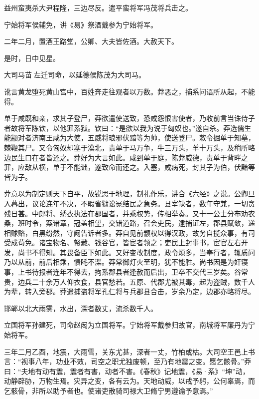 \documentclass[]{article}
\begin{document}
益州蛮夷杀大尹程隆，三边尽反。遣平蛮将军冯茂将兵击之。

宁始将军侯辅免，讲《易》祭酒戴参为宁始将军。

二年二月，置酒王路堂，公卿、大夫皆佐酒。大赦天下。

是时，日中见星。

大司马苗左迁司命，以延德侯陈茂为大司马。

讹言黄龙堕死黄山宫中，百姓奔走往观者以万数。莽恶之，捕系问语所从起，不能得。

单于咸既和亲，求其子登尸，莽欲遣使送致，恐咸怨恨害使者，乃收前言当诛侍子者故将军陈钦，以他罪系狱。钦曰：``是欲以我为说于匈奴也。''遂自杀。莽选儒生能颛对者济南王咸为大使，五威将琅邪伏黯等为帅，使送登尸。敕令掘单于知墓，棘鞭其尸。又令匈奴却塞于漠北，责单于马万争，牛三万头，羊十万头，及稍所略边民生口在者皆还之。莽好为大言如此。咸到单于庭，陈莽威德，责单于背畔之罪，应敌从横，单于不能诎，遂致命而还之。入塞，咸病死，封其子为伯，伏黯等皆为子。

莽意以为制定则天下自平，故锐思于地理，制礼作乐，讲合《六经》之说。公卿旦入暮出，议论连年不决，不暇省狱讼冤结民之急务。县宰缺者，数年守兼，一切贪残日甚。中郎将、绣衣执法在郡国者，并乘权势，传相举奏。又十一公士分布劝农桑，班时令，案诸章，冠盖相望，交错道路，召会吏民，逮捕证左，郡县赋敛，递相赇赂，白黑纷然，守阙告诉者多。莽自见前颛权以得汉政，故务自揽众事，有司受成苟免。诸宝物名、帑藏、钱谷官，皆宦者领之；吏民上封事书，宦官左右开发，尚书不得知。其畏备臣下如此。又好变改制度，政令烦多，当奉行者，辄质问乃以从前，前后相乘，愦眊不渫。莽常御灯火至明，犹不能胜。尚书因是为奸寝事，上书待报者连年不得去，拘系郡县者逢赦而后出，卫卒不交代三岁矣。谷常贵，边兵二十余万人仰衣食，县官愁若。五原、代郡尤被其毒，起为盗贼，数千人为辈，转入旁郡。莽遣捕盗将军孔仁将与兵郡县合击，岁余乃定，边郡亦略将尽。

邯郸以北大雨雾，水出，深者数丈，流杀数千人。

立国将军孙建死，司命赵闳为立国将军。宁始将军戴参归故官，南城将军廉丹为宁始将军。

三年二月乙酉，地震，大雨雪，关东尤甚，深者一丈，竹柏或枯。大司空王邑上书言：``视事八年，功业不效，司空之职尤独废顿，至乃有地震之变。愿乞骸骨。''莽曰：``夫地有动有震，震者有害，动者不害。《春秋》记地震，《易·系》``坤''动，动静辟胁，万物生焉。灾异之变，各有云为。天地动威，以戒予躬，公何辜焉，而乞骸骨，非所以助予者也。使诸吏散骑司禄大卫脩宁男遵谕予意焉。''
\end{document}
